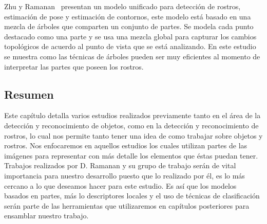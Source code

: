Zhu y Ramanan~\cite{Zhu2012} presentan un modelo unificado para detección de rostros, estimación de pose y estimación de contornos, este modelo está basado en una mezcla de árboles que comparten un conjunto de partes. Se modela cada punto destacado como una parte y se usa una mezcla global para capturar los cambios topológicos de acuerdo al punto de vista que se está analizando. En este estudio se muestra como las técnicas de árboles pueden ser muy eficientes al momento de interpretar las partes que poseen los rostros.

\subsection{Resumen}
Este capítulo detalla varios estudios realizados previamente tanto en el área de la detección y reconocimiento de objetos, como en la detección y reconocimiento de rostros, lo cual nos permite tanto tener una idea de como trabajar sobre objetos y rostros. Nos enfocaremos en aquellos estudios los cuales utilizan partes de las imágenes para representar con más detalle los elementos que éstas puedan tener. Trabajos realizados por D. Ramanan y su grupo de trabajo serán de vital importancia para nuestro desarrollo puesto que lo realizado por él, es lo más cercano a lo que deseamos hacer para este estudio. Es así que los modelos basados en partes, más lo descriptores locales y el uso de técnicas de clasificación serán parte de las herramientas que utilizaremos en capítulos posteriores para ensamblar nuestro trabajo.